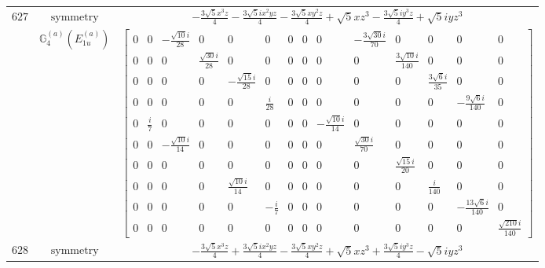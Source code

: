 \documentclass[fleqn,8pt,landscape]{jsarticle}
\begin{document}
\begin{longtable}{ccc}
$ 627 $ & $ \text{symmetry} $ & $ - \frac{3 \sqrt{5} x^{3} z}{4} - \frac{3 \sqrt{5} i x^{2} y z}{4} - \frac{3 \sqrt{5} x y^{2} z}{4} + \sqrt{5} x z^{3} - \frac{3 \sqrt{5} i y^{3} z}{4} + \sqrt{5} i y z^{3} $ \\
$  $ & $ \mathbb{G}_{4}^{(a)}(E_{1u}^{(a)}) $ & $ \begin{bmatrix} 0 & 0 & - \frac{\sqrt{10} i}{28} & 0 & 0 & 0 & 0 & 0 & 0 & - \frac{3 \sqrt{30} i}{70} & 0 & 0 & 0 & 0 \\ 0 & 0 & 0 & \frac{\sqrt{30} i}{28} & 0 & 0 & 0 & 0 & 0 & 0 & \frac{3 \sqrt{10} i}{140} & 0 & 0 & 0 \\ 0 & 0 & 0 & 0 & - \frac{\sqrt{15} i}{28} & 0 & 0 & 0 & 0 & 0 & 0 & \frac{3 \sqrt{6} i}{35} & 0 & 0 \\ 0 & 0 & 0 & 0 & 0 & \frac{i}{28} & 0 & 0 & 0 & 0 & 0 & 0 & - \frac{9 \sqrt{6} i}{140} & 0 \\ 0 & \frac{i}{7} & 0 & 0 & 0 & 0 & 0 & 0 & - \frac{\sqrt{10} i}{14} & 0 & 0 & 0 & 0 & 0 \\ 0 & 0 & - \frac{\sqrt{10} i}{14} & 0 & 0 & 0 & 0 & 0 & 0 & \frac{\sqrt{30} i}{70} & 0 & 0 & 0 & 0 \\ 0 & 0 & 0 & 0 & 0 & 0 & 0 & 0 & 0 & 0 & \frac{\sqrt{15} i}{20} & 0 & 0 & 0 \\ 0 & 0 & 0 & 0 & \frac{\sqrt{10} i}{14} & 0 & 0 & 0 & 0 & 0 & 0 & \frac{i}{140} & 0 & 0 \\ 0 & 0 & 0 & 0 & 0 & - \frac{i}{7} & 0 & 0 & 0 & 0 & 0 & 0 & - \frac{13 \sqrt{6} i}{140} & 0 \\ 0 & 0 & 0 & 0 & 0 & 0 & 0 & 0 & 0 & 0 & 0 & 0 & 0 & \frac{\sqrt{210} i}{140} \end{bmatrix} $ \\ \hline
$ 628 $ & $ \text{symmetry} $ & $ - \frac{3 \sqrt{5} x^{3} z}{4} + \frac{3 \sqrt{5} i x^{2} y z}{4} - \frac{3 \sqrt{5} x y^{2} z}{4} + \sqrt{5} x z^{3} + \frac{3 \sqrt{5} i y^{3} z}{4} - \sqrt{5} i y z^{3} $ \\

\end{longtable}
\end{document}
